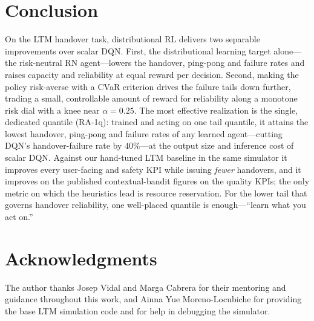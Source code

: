 \documentclass[conference]{IEEEtran}
\begin{document}
\section{Conclusion}
\label{sec:conclusion}
On the LTM handover task, distributional RL delivers two separable improvements
over scalar DQN. First, the distributional learning target alone---the
risk-neutral RN agent---lowers the handover, ping-pong and failure rates and
raises capacity and reliability at equal reward per decision. Second, making the
policy risk-averse with a CVaR criterion drives the failure tails down further,
trading a small, controllable amount of reward for reliability along a monotone
risk dial with a knee near $\alpha=0.25$. The most effective realization is the
single, dedicated quantile (RA-1q): trained and acting on one tail quantile, it
attains the lowest handover, ping-pong and failure rates of any learned
agent---cutting DQN's handover-failure rate by $40\%$---at the output size and
inference cost of scalar DQN. Against our hand-tuned LTM baseline in the same
simulator it improves every user-facing and safety KPI while issuing \emph{fewer}
handovers, and it improves on the published contextual-bandit figures on the
quality KPIs; the only metric on which the heuristics lead is resource
reservation. For the lower tail that governs handover reliability, one well-placed
quantile is enough---``learn what you act on.''

\section*{Acknowledgments}
The author thanks Josep Vidal and Marga Cabrera for their mentoring and
guidance throughout this work, and Ainna Yue Moreno-Locubiche for providing the
base LTM simulation code and for help in debugging the simulator.
\end{document}
